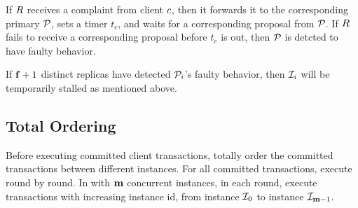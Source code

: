 \par If $\Replica{}$ receives a complaint from client $\Client{}$, then it forwards it to the corresponding 
primary $\mathcal{P}_{}$, sets a timer $t_c$, and waits for a corresponding proposal from $\mathcal{P}_{}$. If $\Replica{}$ 
fails to receive a corresponding proposal before $t_c$ is out, then $\mathcal{P}_{}$ is detcted to have faulty behavior. 

\par If $\mathbf{f}+1$ distinct replicas have detected $\mathcal{P}_{i}$'s faulty behavior, then $\mathcal{I}_{i}$ will be temporarily 
stalled as mentioned above.

\subsection{Total Ordering}

\par Before executing committed client transactions, \RCC{} totally order the committed transactions between different 
instances. For all committed transactions, \RCC{} execute round by round. In \RCC{} with $\mathbf{m}$ concurrent instances, in 
each round, \RCC{} execute transactions with increasing instance id, from instance $\mathcal{I}_{0}$ to instance $\mathcal{I}_{\mathbf{m}-1}$.